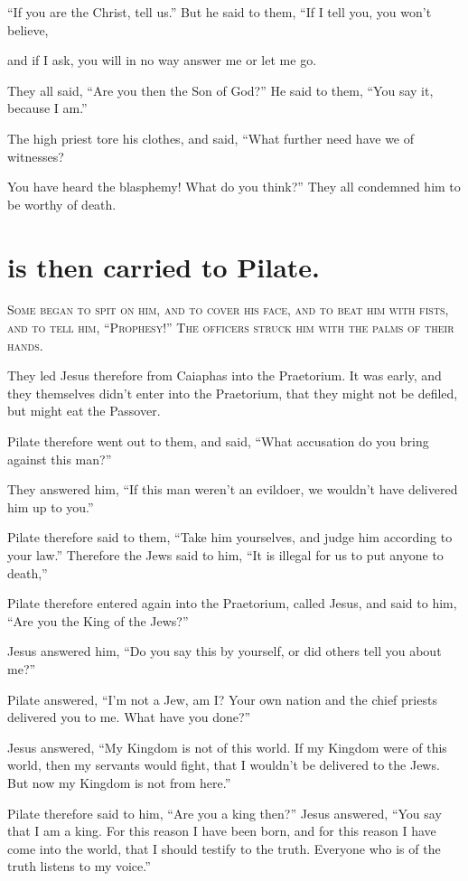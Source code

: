 “If you are the Christ, tell us.” But he said to them, “If I tell you, you won’t believe,

and if I ask, you will in no way answer me or let me go.

They all said, “Are you then the Son of God?” He said to them, “You say it, because I am.”

The high priest tore his clothes, and said, “What further need have we of witnesses?

You have heard the blasphemy! What do you think?” They all condemned him to be worthy of death.

\clearpage \section*{is then carried to Pilate.}

\lettrine{S}{ome began to spit on him, and to cover his face, and to beat him with fists, and to tell him, “Prophesy!” The officers struck him with the palms of their hands.}

They led Jesus therefore from Caiaphas into the Praetorium. It was early, and they themselves didn’t enter into the Praetorium, that they might not be defiled, but might eat the Passover.

Pilate therefore went out to them, and said, “What accusation do you bring against this man?”

They answered him, “If this man weren’t an evildoer, we wouldn’t have delivered him up to you.”

Pilate therefore said to them, “Take him yourselves, and judge him according to your law.” Therefore the Jews said to him, “It is illegal for us to put anyone to death,”

Pilate therefore entered again into the Praetorium, called Jesus, and said to him, “Are you the King of the Jews?”

Jesus answered him, “Do you say this by yourself, or did others tell you about me?”

Pilate answered, “I’m not a Jew, am I? Your own nation and the chief priests delivered you to me. What have you done?”

Jesus answered, “My Kingdom is not of this world. If my Kingdom were of this world, then my servants would fight, that I wouldn’t be delivered to the Jews. But now my Kingdom is not from here.”

Pilate therefore said to him, “Are you a king then?” Jesus answered, “You say that I am a king. For this reason I have been born, and for this reason I have come into the world, that I should testify to the truth. Everyone who is of the truth listens to my voice.”

